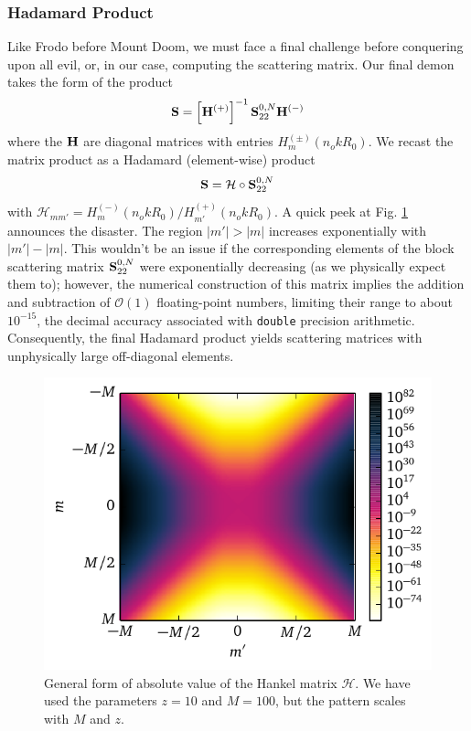 \subsubsection{Hadamard Product}
Like Frodo before Mount Doom, we must face a final challenge
before conquering upon all evil, or, in our case, computing
the scattering matrix. Our final demon
takes the form of the product
  \begin{equation}
   \mathbf{S} = \left[\mathbf{H}^{(+)}\right]^{-1}\mathbf{S}^{0,N}_{22}\mathbf{H}^{(-)}
  \end{equation}
where the $\mathbf{H}$ are diagonal matrices with entries $H_m^{(\pm)}(n_okR_0)$. 
We recast the matrix product as a Hadamard (element-wise) product
 \begin{equation}
  \mathbf{S} = \mathcal{H}\circ\mathbf{S}^{0,N}_{22}
 \end{equation}
with $\mathcal{H}_{mm'} = H_m^{(-)}(n_okR_0)/H_{m'}^{(+)}(n_okR_0)$.
A quick peek at Fig. \ref{fig:passive.numerical.hankelHadamard} 
announces the disaster. The region $|m'|>|m|$ increases 
exponentially with $|m'|-|m|$. This wouldn't be an issue 
if the corresponding elements of the block scattering
matrix $\mathbf{S}^{0,N}_{22}$ were exponentially decreasing (as
we physically expect them to); however, the numerical construction
of this matrix implies the addition and subtraction of $\mathcal{O}(1)$
floating-point numbers, limiting their range to about $10^{-15}$, the decimal
accuracy associated with \texttt{double} precision arithmetic. Consequently, 
the final Hadamard product yields scattering matrices with unphysically
large off-diagonal elements.

\begin{figure}
 \centering
 \includegraphics{figs/passive/absHadamard.pdf}
 \caption[General form of absolute value of the Hankel matrix $\mathcal{H}$]
	 {General form of absolute value of the Hankel matrix $\mathcal{H}$.
	 We have used the parameters $z=10$ and $M=100$, but
	  the pattern scales with $M$ and $z$.}
 \label{fig:passive.numerical.hankelHadamard}
\end{figure}

